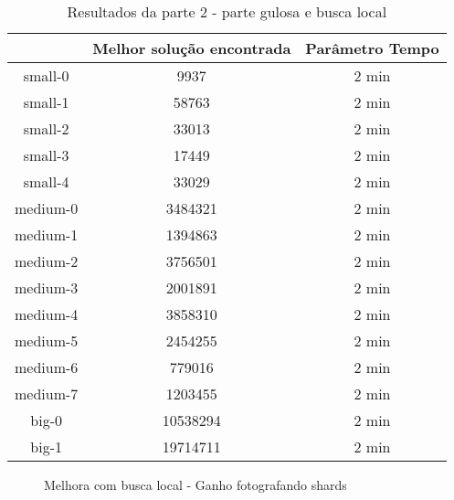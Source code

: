 \documentclass[11pt,letterpaper]{article}
\begin{document}
\begin{table}[h!]
\begin{centering}
\begin{tabular}{|c|c|c|}
\hline 
 & Melhor solução encontrada & Parâmetro Tempo  \tabularnewline
\hline 
\hline 
small-0 & 9937 & 2 min  \tabularnewline %
\hline 
small-1 & 58763 & 2 min  \tabularnewline %
\hline 
small-2 & 33013 & 2 min  \tabularnewline %
\hline 
small-3 & 17449 & 2 min  \tabularnewline %
\hline 
small-4 & 33029 & 2 min  \tabularnewline %
\hline 
medium-0 &  3484321 & 2 min  \tabularnewline %
\hline 
medium-1 & 1394863 & 2 min  \tabularnewline %
\hline 
medium-2 & 3756501 & 2 min  \tabularnewline %
\hline 
medium-3 & 2001891 & 2 min  \tabularnewline %
\hline 
medium-4 & 3858310 & 2 min  \tabularnewline %
\hline 
medium-5 & 2454255 & 2 min  \tabularnewline %
\hline 
medium-6 & 779016 & 2 min  \tabularnewline %
\hline 
medium-7 & 1203455 & 2 min  \tabularnewline %
\hline 
big-0 & 10538294 & 2 min  \tabularnewline %
\hline 
big-1 & 19714711 & 2 min  \tabularnewline %
\hline 

\end{tabular}
\par\end{centering}
\caption{Resultados da parte 2 - parte gulosa e busca local}
\end{table}


\begin{figure}
\begin{center}
\end{center}
\caption{Melhora com busca local - Ganho fotografando shards }
\end{figure}
\end{document}
